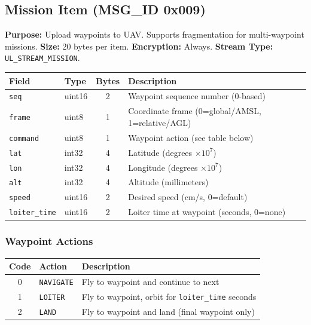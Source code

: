 \documentclass[11pt,a4paper]{article}
\begin{document}
\subsection{Mission Item (MSG\_ID 0x009)}

\textbf{Purpose:} Upload waypoints to UAV. Supports fragmentation for multi-waypoint missions. \textbf{Size:} 20 bytes per item. \textbf{Encryption:} Always. \textbf{Stream Type:} \texttt{UL\_STREAM\_MISSION}.

\begin{table}[H]
\centering
\begin{tabular}{@{}llcl@{}}
\toprule
\textbf{Field} & \textbf{Type} & \textbf{Bytes} & \textbf{Description} \\
\midrule
\texttt{seq}          & uint16 & 2 & Waypoint sequence number (0-based) \\
\texttt{frame}        & uint8  & 1 & Coordinate frame (0=global/AMSL, 1=relative/AGL) \\
\texttt{command}      & uint8  & 1 & Waypoint action (see table below) \\
\texttt{lat}          & int32  & 4 & Latitude (degrees $\times 10^7$) \\
\texttt{lon}          & int32  & 4 & Longitude (degrees $\times 10^7$) \\
\texttt{alt}          & int32  & 4 & Altitude (millimeters) \\
\texttt{speed}        & uint16 & 2 & Desired speed (cm/s, 0=default) \\
\texttt{loiter\_time} & uint16 & 2 & Loiter time at waypoint (seconds, 0=none) \\
\bottomrule
\end{tabular}
\end{table}

\subsubsection{Waypoint Actions}

\begin{table}[H]
\centering
\begin{tabular}{@{}clp{8cm}@{}}
\toprule
\textbf{Code} & \textbf{Action} & \textbf{Description} \\
\midrule
0 & \texttt{NAVIGATE} & Fly to waypoint and continue to next \\
1 & \texttt{LOITER}   & Fly to waypoint, orbit for \texttt{loiter\_time} seconds \\
2 & \texttt{LAND}     & Fly to waypoint and land (final waypoint only) \\
\bottomrule
\end{tabular}
\end{table}
\end{document}
